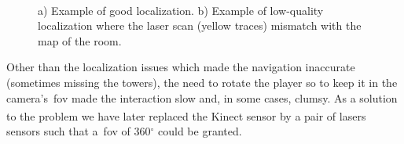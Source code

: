 \begin{figure}
    \centering 
    \begin{subfigure}[h]{0.49\columnwidth}
        \centering 
        \caption{}
    \end{subfigure}
    ~
    \begin{subfigure}[h]{0.49\columnwidth}
        \centering 
        \caption{}
        \label{fig:laser_map_mismatch}
    \end{subfigure}
    \caption{a) Example of good localization. b) Example of low-quality localization where the laser scan (yellow traces) mismatch with the map of the room.}
    \label{fig:maps}
\end{figure}

Other than the localization issues which made the navigation inaccurate (sometimes missing the towers), the need to rotate the player so to keep it in the camera's~\gls{fov} made the interaction slow and, in some cases, clumsy. As a solution to the problem we have later replaced the Kinect\textsuperscript{\textregistered} sensor by a pair of lasers sensors such that a~\gls{fov} of 360$^\circ$ could be granted.

